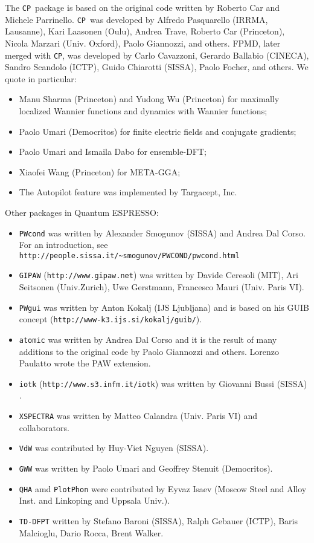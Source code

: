 \documentclass[12pt,a4paper]{article}
\def\qe{{\sc Quantum ESPRESSO}}
\def\CP{\texttt{CP}}
\begin{document}
The \CP\ package is based on the original code written by
 Roberto Car
and Michele Parrinello. \CP\ was developed by Alfredo Pasquarello
(IRRMA, Lausanne), Kari Laasonen (Oulu), Andrea Trave, Roberto
Car (Princeton), Nicola Marzari (Univ. Oxford), Paolo Giannozzi, and others.
FPMD, later merged with \CP, was developed by Carlo
Cavazzoni, 
Gerardo Ballabio (CINECA), Sandro Scandolo (ICTP), 
Guido Chiarotti (SISSA), Paolo Focher, and others.
We quote in particular:
\begin{itemize}
  \item Manu Sharma (Princeton) and Yudong Wu (Princeton) for
   maximally localized Wannier functions and dynamics with 
   Wannier functions;
  \item Paolo Umari (Democritos) for finite electric fields and conjugate
   gradients;
  \item Paolo Umari and Ismaila Dabo for ensemble-DFT;
  \item Xiaofei Wang (Princeton) for META-GGA;
  \item The Autopilot feature was implemented by Targacept, Inc.
\end{itemize}
Other packages in \qe:
\begin{itemize}
\item
\texttt{PWcond} was written by Alexander Smogunov (SISSA) and Andrea 
Dal Corso. For an introduction, see 
\texttt{http://people.sissa.it/\~{}smogunov/PWCOND/pwcond.html}
\item
\texttt{GIPAW} (\texttt{http://www.gipaw.net})
was written by Davide Ceresoli (MIT), Ari Seitsonen (Univ.Zurich),
Uwe Gerstmann,  Francesco Mauri (Univ. Paris VI).
\item
\texttt{PWgui} was written by Anton Kokalj (IJS Ljubljana) and is 
based on his GUIB concept (\texttt{http://www-k3.ijs.si/kokalj/guib/}).
\item
\texttt{atomic} was written by Andrea Dal Corso and it is the result 
of many additions to the original code by Paolo Giannozzi 
and others. Lorenzo Paulatto wrote the PAW extension.
\item
\texttt{iotk} (\texttt{http://www.s3.infm.it/iotk}) was written by Giovanni Bussi  (SISSA)  .
\item
\texttt{XSPECTRA} was written by Matteo Calandra (Univ. Paris VI)
and collaborators.
\item \texttt{VdW} was contributed by Huy-Viet Nguyen (SISSA).
\item \texttt{GWW} was written by Paolo Umari and Geoffrey Stenuit (Democritos).
\item
\texttt{QHA} amd \texttt{PlotPhon} were contributed by Eyvaz Isaev
 (Moscow Steel and Alloy Inst. and Linkoping and Uppsala Univ.).
\item \texttt{TD-DFPT} written by Stefano Baroni (SISSA), Ralph Gebauer (ICTP), 
Baris Malcioglu, Dario Rocca, Brent Walker.
\end{itemize}
\end{document}
